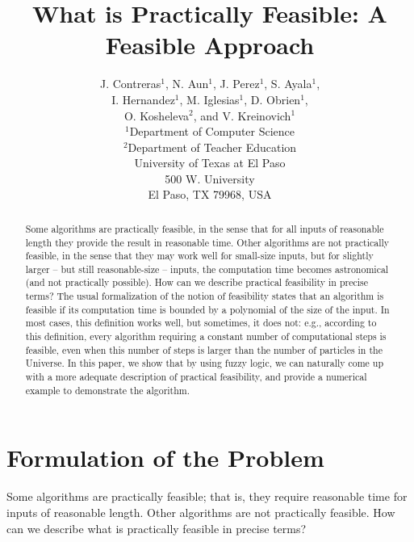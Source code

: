 \documentclass[draft]{article}
\theoremstyle{definition}
\begin{document}
\title{What is Practically Feasible: A Feasible Approach}
\author{J. Contreras$^1$, N. Aun$^1$, J. Perez$^1$, S. Ayala$^1$,\\
I. Hernandez$^1$, M. Iglesias$^1$, D. Obrien$^1$, \\
O. Kosheleva$^2$, and V. Kreinovich$^1$\\
$^1$Department of Computer Science\\
$^2$Department of Teacher Education\\
University of Texas at El Paso\\
500 W. University\\
El Paso, TX 79968, USA}
\date{}
\maketitle

\begin{abstract}
Some algorithms are practically feasible, in the sense that for all inputs
of reasonable length they provide the result in reasonable time. Other algorithms
are not practically feasible, in the sense that they may work well for small-size inputs, but for slightly larger – but still reasonable-size – inputs, the computation time
becomes astronomical (and not practically possible). How can we describe practical feasibility in precise terms? The usual formalization of the notion of feasibility
states that an algorithm is feasible if its computation time is bounded by a polynomial of the size of the input. In most cases, this definition works well, but sometimes,
it does not: e.g., according to this definition, every algorithm requiring a constant
number of computational steps is feasible, even when this number of steps is larger
than the number of particles in the Universe. In this paper, we show that by using
fuzzy logic, we can naturally come up with a more adequate description of practical
feasibility, and provide a numerical example to demonstrate the algorithm.
\end{abstract}

\section{Formulation of the Problem}

Some algorithms are practically feasible; that is, they require reasonable time for inputs of reasonable length. Other algorithms are not practically feasible. How can we describe what is practically feasible in precise terms?
\end{document}
